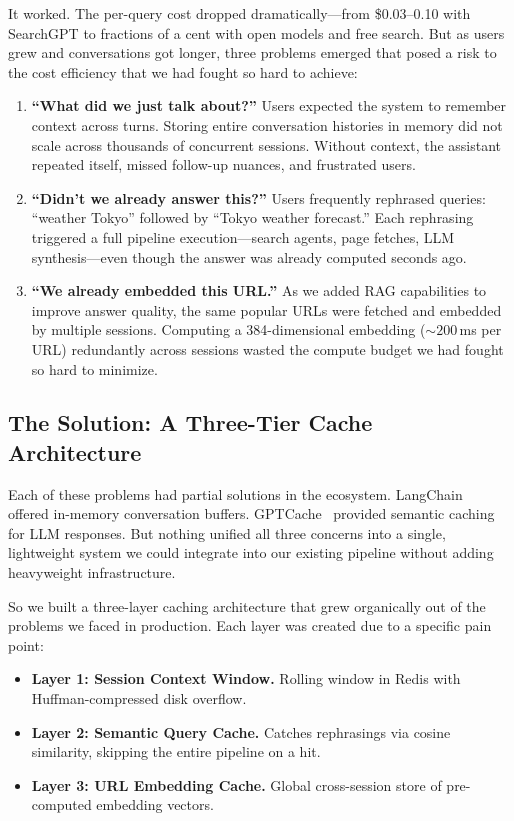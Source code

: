 \documentclass[conference]{IEEEtran}
\begin{document}
It worked. The per-query cost dropped dramatically---from \$0.03--0.10 with SearchGPT to fractions of a cent with open models and free search. But as users grew and conversations got longer, three problems emerged that posed a risk to the cost efficiency that we had fought so hard to achieve:

\begin{enumerate}
\item \textbf{``What did we just talk about?''} Users expected the system to remember context across turns. Storing entire conversation histories in memory did not scale across thousands of concurrent sessions. Without context, the assistant repeated itself, missed follow-up nuances, and frustrated users.

\item \textbf{``Didn't we already answer this?''} Users frequently rephrased queries: ``weather Tokyo'' followed by ``Tokyo weather forecast.'' Each rephrasing triggered a full pipeline execution---search agents, page fetches, LLM synthesis---even though the answer was already computed seconds ago.

\item \textbf{``We already embedded this URL.''} As we added RAG capabilities to improve answer quality, the same popular URLs were fetched and embedded by multiple sessions. Computing a 384-dimensional embedding (${\sim}200$\,ms per URL) redundantly across sessions wasted the compute budget we had fought so hard to minimize.
\end{enumerate}

\subsection{The Solution: A Three-Tier Cache Architecture}

Each of these problems had partial solutions in the ecosystem. LangChain~\cite{langchain2023} offered in-memory conversation buffers. GPTCache~\cite{gptcache2023} provided semantic caching for LLM responses. But nothing unified all three concerns into a single, lightweight system we could integrate into our existing pipeline without adding heavyweight infrastructure.

So we built a three-layer caching architecture that grew organically out of the problems we faced in production. Each layer was created due to a specific pain point:

\begin{itemize}
\item \textbf{Layer 1: Session Context Window.} Rolling window in Redis with Huffman-compressed disk overflow.
\item \textbf{Layer 2: Semantic Query Cache.} Catches rephrasings via cosine similarity, skipping the entire pipeline on a hit.
\item \textbf{Layer 3: URL Embedding Cache.} Global cross-session store of pre-computed embedding vectors.
\end{itemize}
\end{document}
